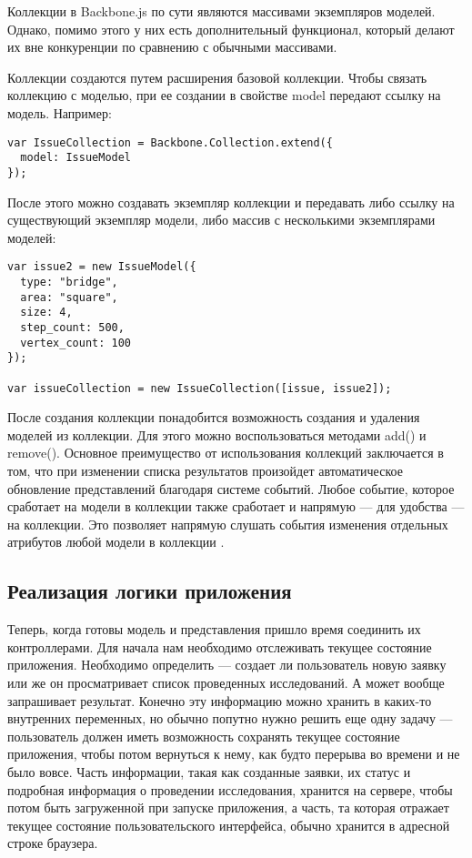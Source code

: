 Коллекции в Backbone.js по сути являются массивами экземпляров моделей. Однако, помимо этого у них есть дополнительный функционал, который делают их вне конкуренции по сравнению с обычными массивами.

Коллекции создаются путем расширения базовой коллекции. Чтобы связать коллекцию с моделью, при ее создании в свойстве model передают ссылку на модель. Например:
\begin{lstlisting}
var IssueCollection = Backbone.Collection.extend({
  model: IssueModel
});
\end{lstlisting}
После этого можно создавать экземпляр коллекции и передавать либо ссылку на существующий экземпляр модели, либо массив с несколькими экземплярами моделей:
\begin{lstlisting}
var issue2 = new IssueModel({
  type: "bridge",
  area: "square",
  size: 4,
  step_count: 500,
  vertex_count: 100
});

var issueCollection = new IssueCollection([issue, issue2]);
\end{lstlisting}
После создания коллекции понадобится возможность создания и удаления моделей из коллекции. Для этого можно воспользоваться методами add() и remove(). Основное преимущество от использования коллекций заключается в том, что при изменении списка результатов произойдет автоматическое обновление представлений благодаря системе событий. Любое событие, которое сработает на модели в коллекции также сработает и напрямую --- для удобства --- на коллекции. Это позволяет напрямую слушать события изменения отдельных атрибутов любой модели в коллекции \cite{backbone}.

\subsection{Реализация логики приложения}

Теперь, когда готовы модель и представления пришло время соединить их контроллерами. Для начала нам необходимо отслеживать текущее состояние приложения. Необходимо определить --- создает ли пользователь новую заявку или же он просматривает список проведенных исследований. А может вообще запрашивает результат.  Конечно эту информацию можно хранить в каких-то внутренних переменных, но обычно попутно нужно решить еще одну задачу — пользователь должен иметь возможность сохранять текущее состояние приложения, чтобы потом вернуться к нему, как будто перерыва во времени и не было вовсе. Часть информации, такая как созданные заявки, их статус и подробная информация о проведении исследования, хранится на сервере, чтобы потом быть загруженной при запуске приложения, а часть, та которая отражает текущее состояние пользовательского интерфейса, обычно хранится в адресной строке браузера. 

